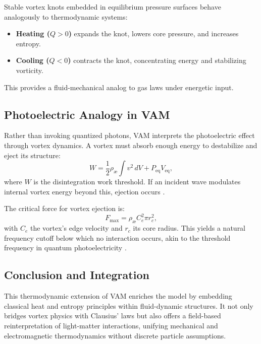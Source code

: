 Stable vortex knots embedded in equilibrium pressure surfaces behave analogously to thermodynamic systems:
\begin{itemize}
\item \textbf{Heating ($Q > 0$)} expands the knot, lowers core pressure, and increases entropy.
\item \textbf{Cooling ($Q < 0$)} contracts the knot, concentrating energy and stabilizing vorticity.
\end{itemize}
This provides a fluid-mechanical analog to gas laws under energetic input.

\subsection{Photoelectric Analogy in VAM}

Rather than invoking quantized photons, VAM interprets the photoelectric effect through vortex dynamics. A vortex must absorb enough energy to destabilize and eject its structure:
\begin{equation}
W = \frac{1}{2} \rho_{\text{\ae}} \int v^2 \, dV + P_{\text{eq}} V_{\text{eq}},\label{eq:photoelectric_work}
\end{equation}
where $W$ is the disintegration work threshold. If an incident wave modulates internal vortex energy beyond this, ejection occurs \cite{vam2025unified}.

The critical force for vortex ejection is:
\begin{equation}
F_{\max} = \rho_{\text{\ae}} C_e^2 \pi r_c^2,\label{eq:critical_force}
\end{equation}
with $C_e$ the vortex's edge velocity and $r_c$ its core radius. This yields a natural frequency cutoff below which no interaction occurs, akin to the threshold frequency in quantum photoelectricity \cite{einstein1905photoelectric}.

\subsection*{Conclusion and Integration}

This thermodynamic extension of VAM enriches the model by embedding classical heat and entropy principles within fluid-dynamic structures. It not only bridges vortex physics with Clausius' laws but also offers a field-based reinterpretation of light-matter interactions, unifying mechanical and electromagnetic thermodynamics without discrete particle assumptions.

